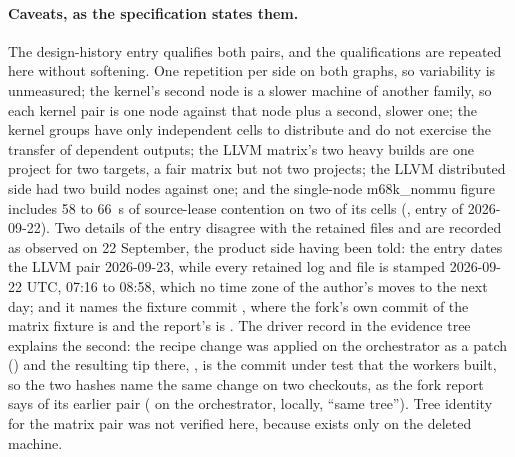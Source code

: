 \paragraph{Caveats, as the specification states them.}
The design-history entry qualifies both pairs, and the qualifications are
repeated here without softening. One repetition per side on both graphs, so
variability is unmeasured; the kernel's second node is a slower machine of
another family, so each kernel pair is one node against that node plus a
second, slower one; the kernel groups have only independent cells to
distribute and do not exercise the transfer of dependent outputs; the LLVM
matrix's two heavy builds are one project for two targets, a fair matrix but
not two projects; the LLVM distributed side had two build nodes against one;
and the single-node m68k\_nommu figure includes 58 to 66~s of source-lease
contention on two of its cells (, entry of
2026-09-22). Two details of the entry disagree with the retained files and
are recorded as observed on 22 September, the product side having been told:
the entry dates the LLVM pair 2026-09-23, while every retained log and
 file is stamped 2026-09-22 UTC, 07:16 to 08:58, which no time
zone of the author's moves to the next day; and it names the fixture commit
, where the fork's own commit of the matrix fixture is
 and the report's is . The driver record
 in the evidence tree explains the second:
the recipe change was applied on the orchestrator as a patch
()
and the resulting tip there, , is the commit under test that
the workers built, so the two hashes name the same change on two checkouts,
as the fork report says of its earlier pair ( on the
orchestrator,  locally, ``same tree''). Tree identity for the
matrix pair was not verified here, because  exists only on the
deleted machine.

